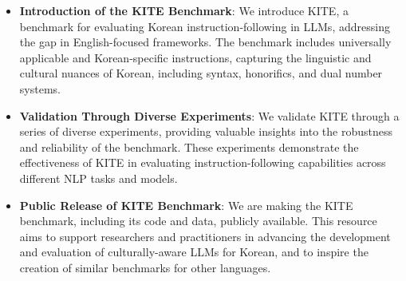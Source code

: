     \begin{itemize}
    \item \textbf{Introduction of the KITE Benchmark}: We introduce KITE, a benchmark for evaluating Korean instruction-following in LLMs, addressing the gap in English-focused frameworks. The benchmark includes universally applicable and Korean-specific instructions, capturing the linguistic and cultural nuances of Korean, including syntax, honorifics, and dual number systems.

    \item \textbf{Validation Through Diverse Experiments}: We validate KITE through a series of diverse experiments, providing valuable insights into the robustness and reliability of the benchmark. These experiments demonstrate the effectiveness of KITE in evaluating instruction-following capabilities across different NLP tasks and models.

    \item \textbf{Public Release of KITE Benchmark}: We are making the KITE benchmark, including its code and data, publicly available. This resource aims to support researchers and practitioners in advancing the development and evaluation of culturally-aware LLMs for Korean, and to inspire the creation of similar benchmarks for other languages.
    \end{itemize}

